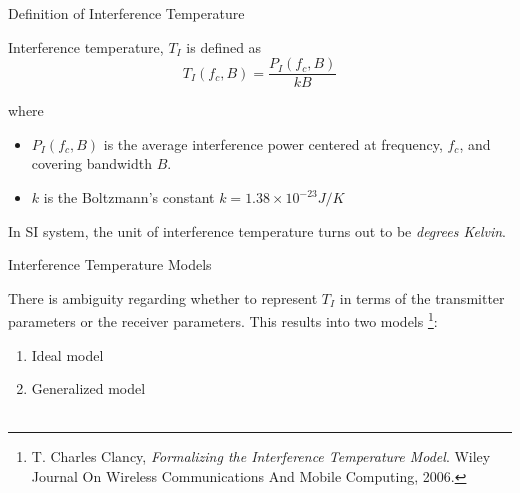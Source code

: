 \documentclass[mathserif]{beamer}
\begin{document}
\begin{frame}{Definition of Interference Temperature}

Interference temperature, $T_I$ is defined as
\begin{equation*} 
    T_I(f_c , B) = \frac{P_I(f_c , B)}{kB}
\end{equation*}

where 

\begin{itemize}
	\item $P_I(f_c,B)$ is the average interference power centered at frequency, $f_c$, and covering bandwidth
$B$. 
	\item $k$ is the Boltzmann's constant $k = 1.38 \times 10^{-23} J/K $ 
\end{itemize}

\pause
In SI system, the unit of interference temperature turns out to be \emph{degrees Kelvin}.

\end{frame}



\begin{frame}{Interference Temperature Models}

There is ambiguity regarding whether to represent $T_I$ in terms of the transmitter parameters or the receiver parameters. This results into two models \footnote{T. Charles Clancy, \emph{Formalizing the Interference Temperature Model}. Wiley Journal On Wireless Communications And Mobile Computing, 2006.}:

\pause
\begin{enumerate}
    \item Ideal model
    \item Generalized model \\~\\
\end{enumerate}


\end{frame}
\end{document}
